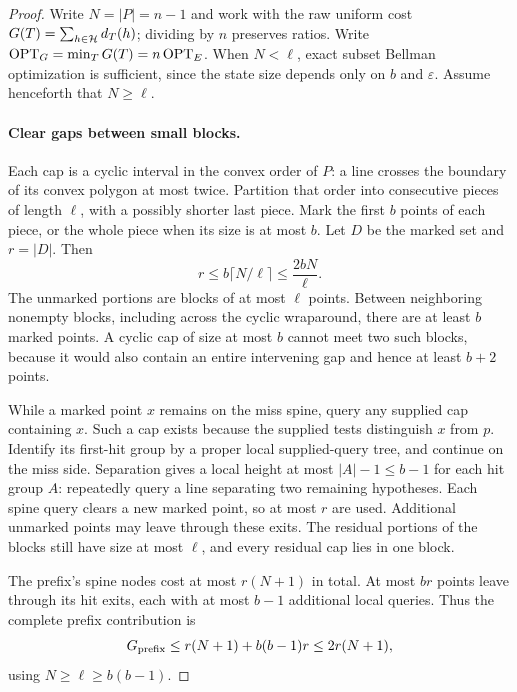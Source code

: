 \begin{proof}
Write $N=|P|=n-1$ and work with the raw uniform cost
$G(T)=\sum_{h\in\mathcal H}d_T(h)$; dividing by $n$ preserves ratios.
Write $\operatorname{OPT}_G=\min_TG(T)=n\operatorname{OPT}_E$.
When $N<\ell$, exact subset Bellman optimization is sufficient,
since the state size depends only on $b$ and $\varepsilon$.
Assume henceforth that $N\ge\ell$.

\paragraph{Clear gaps between small blocks.}
Each cap is a cyclic interval in the convex order of $P$: a line
crosses the boundary of its convex polygon at most twice. Partition
that order into consecutive pieces of length $\ell$, with a possibly
shorter last piece. Mark the first $b$ points of each piece, or the
whole piece when its size is at most $b$. Let $D$ be the marked set
and $r=|D|$. Then
\begin{equation}\label{eq:uniform-cap-deletion-count}
 r\le b\lceil N/\ell\rceil\le\frac{2bN}{\ell}.
\end{equation}
The unmarked portions are blocks of at most $\ell$ points. Between
neighboring nonempty blocks, including across the cyclic wraparound,
there are at least $b$ marked points. A cyclic cap of size at most $b$
cannot meet two such blocks, because it would also contain an entire
intervening gap and hence at least $b+2$ points.

While a marked point $x$ remains on the miss spine, query any supplied
cap containing $x$. Such a cap exists because the supplied tests
distinguish $x$ from $p$. Identify its first-hit group by a proper
local supplied-query tree, and continue on the miss side. Separation
gives a local height at most $|A|-1\le b-1$ for each hit group $A$:
repeatedly query a line separating two remaining hypotheses. Each
spine query clears a new marked point, so at most $r$ are used.
Additional unmarked points may leave through these exits. The
residual portions of the blocks still have size at most $\ell$, and
every residual cap lies in one block.

The prefix's spine nodes cost at most $r(N+1)$ in total. At most
$br$ points leave through its hit exits, each with at most $b-1$
additional local queries. Thus the complete prefix contribution is
\begin{equation}\label{eq:uniform-cap-prefix-cost}
 G_{\rm prefix}\le r(N+1)+b(b-1)r\le2r(N+1),
\end{equation}
using $N\ge\ell\ge b(b-1)$.


\end{proof}
